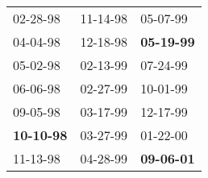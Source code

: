 \begin{supertabular}{p{0.33\columnwidth}p{0.33\columnwidth}p{0.33\columnwidth}}
          02-28-98\textsuperscript{} &  11-14-98\textsuperscript{} &           05-07-99\textsuperscript{} \\
          04-04-98\textsuperscript{} &  12-18-98\textsuperscript{} &  \textbf{05-19-99\textsuperscript{}} \\
          05-02-98\textsuperscript{} &  02-13-99\textsuperscript{} &           07-24-99\textsuperscript{} \\
          06-06-98\textsuperscript{} &  02-27-99\textsuperscript{} &           10-01-99\textsuperscript{} \\
          09-05-98\textsuperscript{} &  03-17-99\textsuperscript{} &           12-17-99\textsuperscript{} \\
 \textbf{10-10-98\textsuperscript{}} &  03-27-99\textsuperscript{} &           01-22-00\textsuperscript{} \\
          11-13-98\textsuperscript{} &  04-28-99\textsuperscript{} &  \textbf{09-06-01\textsuperscript{}} \\
\end{supertabular}
